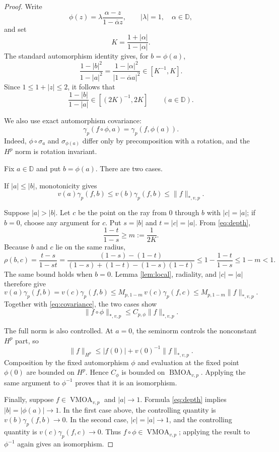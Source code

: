 \documentclass[11pt]{article}
\newcommand{\D}{\mathbb D}
\newcommand{\BMOA}{\operatorname{BMOA}}
\newcommand{\VMOA}{\operatorname{VMOA}}
\begin{document}
\begin{proof}
Write
\[
 \phi(z)=\lambda\frac{\alpha-z}{1-\overline\alpha z},
 \qquad |\lambda|=1,\quad \alpha\in\D,
\]
and set
\[
 K=\frac{1+|\alpha|}{1-|\alpha|}.
\]
The standard automorphism identity gives, for $b=\phi(a)$,
\[
 \frac{1-|b|^2}{1-|a|^2}
 =\frac{1-|\alpha|^2}{|1-\overline\alpha a|^2}
 \in[K^{-1},K].
\]
Since $1\le 1+|z|\le2$, it follows that
\begin{equation}\label{eq:depth}
 \frac{1-|b|}{1-|a|}\in[(2K)^{-1},2K]
 \qquad(a\in\D).
\end{equation}

We also use exact automorphism covariance:
\begin{equation}\label{eq:covariance}
 \gamma_p(f\circ\phi,a)=\gamma_p(f,\phi(a)).
\end{equation}
Indeed, $\phi\circ\sigma_a$ and $\sigma_{\phi(a)}$ differ only by precomposition with a rotation, and the $H^p$ norm is rotation invariant.

Fix $a\in\D$ and put $b=\phi(a)$. There are two cases.

If $|a|\le|b|$, monotonicity gives
\[
 v(a)\gamma_p(f,b)\le v(b)\gamma_p(f,b)\le\|f\|_{*,v,p}.
\]

Suppose $|a|>|b|$. Let $c$ be the point on the ray from $0$ through $b$ with $|c|=|a|$; if $b=0$, choose any argument for $c$. Put $s=|b|$ and $t=|c|=|a|$. From \eqref{eq:depth},
\[
 \frac{1-t}{1-s}\ge m:=\frac1{2K}.
\]
Because $b$ and $c$ lie on the same radius,
\[
 \rho(b,c)=\frac{t-s}{1-st}
 =\frac{(1-s)-(1-t)}{(1-s)+(1-t)-(1-s)(1-t)}
 \le 1-\frac{1-t}{1-s}\le1-m<1.
\]
The same bound holds when $b=0$. Lemma \ref{lem:local}, radiality, and $|c|=|a|$ therefore give
\[
 v(a)\gamma_p(f,b)=v(c)\gamma_p(f,b)
 \le M_{p,1-m}\,v(c)\gamma_p(f,c)
 \le M_{p,1-m}\|f\|_{*,v,p}.
\]
Together with \eqref{eq:covariance}, the two cases show
\[
 \|f\circ\phi\|_{*,v,p}\le C_{p,\phi}\|f\|_{*,v,p}.
\]

The full norm is also controlled. At $a=0$, the seminorm controls the nonconstant $H^p$ part, so
\[
 \|f\|_{H^p}\le |f(0)|+v(0)^{-1}\|f\|_{*,v,p}.
\]
Composition by the fixed automorphism $\phi$ and evaluation at the fixed point $\phi(0)$ are bounded on $H^p$. Hence $C_\phi$ is bounded on $\BMOA_{v,p}$. Applying the same argument to $\phi^{-1}$ proves that it is an isomorphism.

Finally, suppose $f\in\VMOA_{v,p}$ and $|a|\to1$. Formula \eqref{eq:depth} implies $|b|=|\phi(a)|\to1$. In the first case above, the controlling quantity is $v(b)\gamma_p(f,b)\to0$. In the second case, $|c|=|a|\to1$, and the controlling quantity is $v(c)\gamma_p(f,c)\to0$. Thus $f\circ\phi\in\VMOA_{v,p}$; applying the result to $\phi^{-1}$ again gives an isomorphism.
\end{proof}
\end{document}
